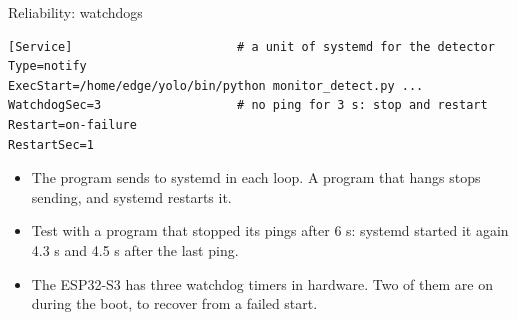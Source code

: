 \begin{frame}[fragile]{Reliability: watchdogs}
\begin{lstlisting}[basicstyle=\ttfamily\scriptsize]
[Service]                       # a unit of systemd for the detector
Type=notify
ExecStart=/home/edge/yolo/bin/python monitor_detect.py ...
WatchdogSec=3                   # no ping for 3 s: stop and restart
Restart=on-failure
RestartSec=1
\end{lstlisting}
  \small
  \begin{itemize}
    \item The program sends  to systemd in each loop. A
          program that hangs stops sending, and systemd restarts it.
    \item Test with a program that stopped its pings after 6 s: systemd
          started it again 4.3 s and 4.5 s after the last ping.
    \item The ESP32-S3 has three watchdog timers in hardware. Two of them
          are on during the boot, to recover from a failed start.
  \end{itemize}
\end{frame}

